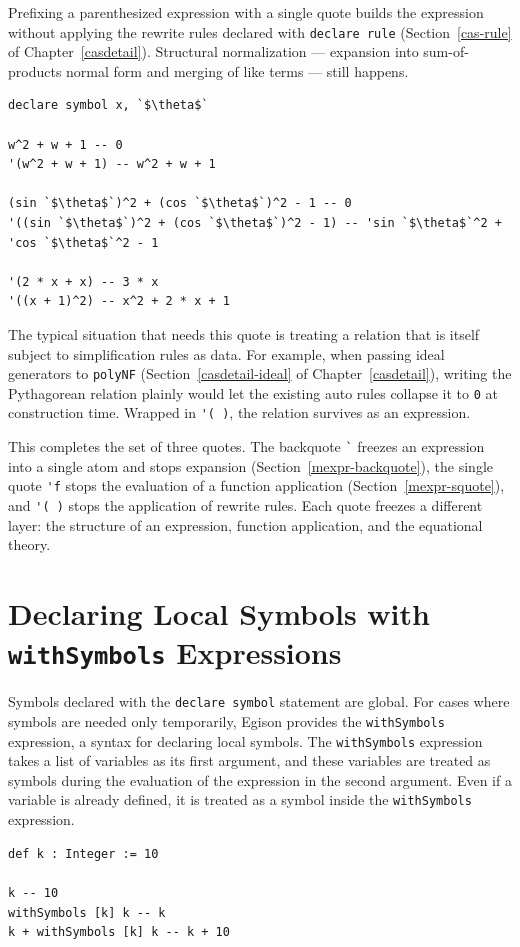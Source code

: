 Prefixing a parenthesized expression with a single quote builds the expression without applying the rewrite rules declared with \lstinline{declare rule} (Section~\ref{cas-rule} of Chapter~\ref{casdetail}).
Structural normalization --- expansion into sum-of-products normal form and merging of like terms --- still happens.
\begin{lstlisting}[language=egison,numbers=none]
declare symbol x, `$\theta$`

w^2 + w + 1 -- 0
'(w^2 + w + 1) -- w^2 + w + 1

(sin `$\theta$`)^2 + (cos `$\theta$`)^2 - 1 -- 0
'((sin `$\theta$`)^2 + (cos `$\theta$`)^2 - 1) -- 'sin `$\theta$`^2 + 'cos `$\theta$`^2 - 1

'(2 * x + x) -- 3 * x
'((x + 1)^2) -- x^2 + 2 * x + 1
\end{lstlisting}
The typical situation that needs this quote is treating a relation that is itself subject to simplification rules as data.
For example, when passing ideal generators to \lstinline{polyNF} (Section~\ref{casdetail-ideal} of Chapter~\ref{casdetail}), writing the Pythagorean relation plainly would let the existing auto rules collapse it to \lstinline{0} at construction time.
Wrapped in \lstinline{'( )}, the relation survives as an expression.

This completes the set of three quotes.
The backquote \lstinline{`} freezes an expression into a single atom and stops expansion (Section~\ref{mexpr-backquote}), the single quote \lstinline{'f} stops the evaluation of a function application (Section~\ref{mexpr-squote}), and \lstinline{'( )} stops the application of rewrite rules.
Each quote freezes a different layer: the structure of an expression, function application, and the equational theory.

\section{Declaring Local Symbols with \texttt{withSymbols} Expressions}\label{mexpr-withsym}

Symbols declared with the \lstinline{declare symbol} statement are global.
For cases where symbols are needed only temporarily, Egison provides the \lstinline{withSymbols} expression, a syntax for declaring local symbols.
The \lstinline{withSymbols} expression takes a list of variables as its first argument, and these variables are treated as symbols during the evaluation of the expression in the second argument.
Even if a variable is already defined, it is treated as a symbol inside the \lstinline{withSymbols} expression.
\begin{lstlisting}[language=egison,numbers=none]
def k : Integer := 10

k -- 10
withSymbols [k] k -- k
k + withSymbols [k] k -- k + 10
\end{lstlisting}

